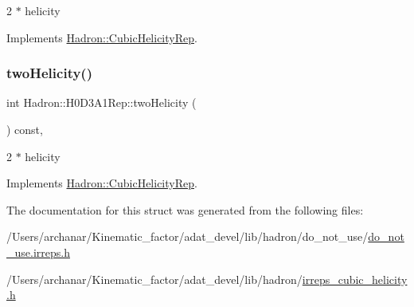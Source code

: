 2 $\ast$ helicity 

Implements \mbox{\hyperlink{structHadron_1_1CubicHelicityRep_af507aa56fc2747eacc8cb6c96db31ecc}{Hadron\+::\+Cubic\+Helicity\+Rep}}.

\mbox{\label{structHadron_1_1H0D3A1Rep_a2a2524dad4c9988ef8a9ffb9a5ffa576}} 
\subsubsection{\texorpdfstring{twoHelicity()}{twoHelicity()}\hspace{0.1cm}{\footnotesize\ttfamily [2/2]}}
{\footnotesize\ttfamily int Hadron\+::\+H0\+D3\+A1\+Rep\+::two\+Helicity (\begin{DoxyParamCaption}{ }\end{DoxyParamCaption}) const\hspace{0.3cm}{\ttfamily [inline]}, {\ttfamily [virtual]}}

2 $\ast$ helicity 

Implements \mbox{\hyperlink{structHadron_1_1CubicHelicityRep_af507aa56fc2747eacc8cb6c96db31ecc}{Hadron\+::\+Cubic\+Helicity\+Rep}}.



The documentation for this struct was generated from the following files\+:\begin{DoxyCompactItemize}
\item 
/\+Users/archanar/\+Kinematic\+\_\+factor/adat\+\_\+devel/lib/hadron/do\+\_\+not\+\_\+use/\mbox{\hyperlink{do__not__use_8irreps_8h}{do\+\_\+not\+\_\+use.\+irreps.\+h}}\item 
/\+Users/archanar/\+Kinematic\+\_\+factor/adat\+\_\+devel/lib/hadron/\mbox{\hyperlink{lib_2hadron_2irreps__cubic__helicity_8h}{irreps\+\_\+cubic\+\_\+helicity.\+h}}\end{DoxyCompactItemize}
